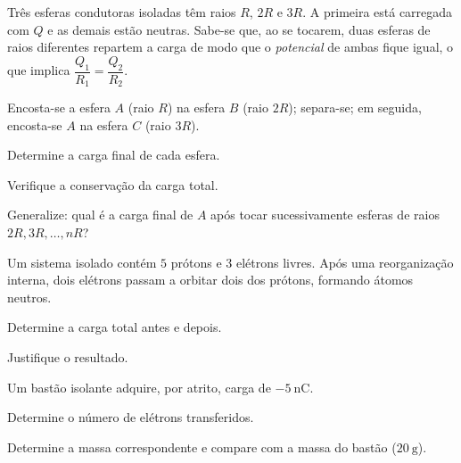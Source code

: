 \begin{questao}[3]{}

Três esferas condutoras isoladas têm raios $R$, $2R$ e $3R$. A primeira está
carregada com $Q$ e as demais estão neutras. Sabe-se que, ao se tocarem, duas
esferas de raios diferentes repartem a carga de modo que o \emph{potencial} de
ambas fique igual, o que implica $\dfrac{Q_1}{R_1}=\dfrac{Q_2}{R_2}$.

Encosta-se a esfera $A$ (raio $R$) na esfera $B$ (raio $2R$); separa-se; em
seguida, encosta-se $A$ na esfera $C$ (raio $3R$).
\begin{itensq}
\item Determine a carga final de cada esfera.
\item Verifique a conservação da carga total.
\item Generalize: qual é a carga final de $A$ após tocar sucessivamente esferas de
      raios $2R, 3R, \dots, nR$?
\end{itensq}


\end{questao}

\blocoaprofundamento
\begin{questao}[3]{}

Um sistema isolado contém $5$ prótons e $3$ elétrons livres. Após uma
reorganização interna, dois elétrons passam a orbitar dois dos prótons,
formando átomos neutros.
\begin{itensq}
\item Determine a carga total antes e depois.
\item Justifique o resultado.
\end{itensq}


\end{questao}
\begin{questao}[3]{}

Um bastão isolante adquire, por atrito, carga de $\SI{-5}{\nano\coulomb}$.
\begin{itensq}
\item Determine o número de elétrons transferidos.
\item Determine a massa correspondente e compare com a massa do bastão
      ($\SI{20}{\gram}$).
\end{itensq}


\end{questao}

